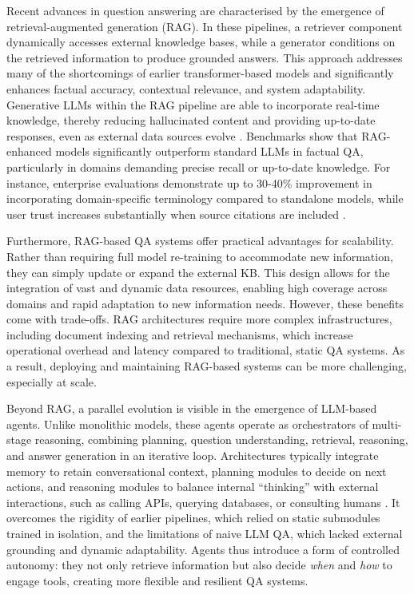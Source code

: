 \begin{spacing}{1.5}
Recent advances in question answering are characterised by the emergence of retrieval-augmented generation (RAG). In these pipelines, a retriever component dynamically accesses external knowledge bases, while a generator conditions on the retrieved information to produce grounded answers. This approach addresses many of the shortcomings of earlier transformer-based models and significantly enhances factual accuracy, contextual relevance, and system adaptability. Generative LLMs within the RAG pipeline are able to incorporate real-time knowledge, thereby reducing hallucinated content and providing up-to-date responses, even as external data sources evolve \citep{yue_survey_2025,lewis_retrieval-augmented_2020}. Benchmarks show that RAG-enhanced models significantly outperform standard LLMs in factual QA, particularly in domains demanding precise recall or up-to-date knowledge. For instance, enterprise evaluations demonstrate up to 30-40\% improvement in incorporating domain-specific terminology compared to standalone models, while user trust increases substantially when source citations are included \citep{vaibhav_retrieval-augmented_2025}.

Furthermore, RAG-based QA systems offer practical advantages for scalability. Rather than requiring full model re-training to accommodate new information, they can simply update or expand the external KB. This design allows for the integration of vast and dynamic data resources, enabling high coverage across domains and rapid adaptation to new information needs. However, these benefits come with trade-offs. RAG architectures require more complex infrastructures, including document indexing and retrieval mechanisms, which increase operational overhead and latency compared to traditional, static QA systems. As a result, deploying and maintaining RAG-based systems can be more challenging, especially at scale.

Beyond RAG, a parallel evolution is visible in the emergence of LLM-based agents. Unlike monolithic models, these agents operate as orchestrators of multi-stage reasoning, combining planning, question understanding, retrieval, reasoning, and answer generation in an iterative loop. Architectures typically integrate memory to retain conversational context, planning modules to decide on next actions, and reasoning modules to balance internal ``thinking'' with external interactions, such as calling APIs, querying databases, or consulting humans \parencite{yue_survey_2025}. It overcomes the rigidity of earlier pipelines, which relied on static submodules trained in isolation, and the limitations of naive LLM QA, which lacked external grounding and dynamic adaptability. Agents thus introduce a form of controlled autonomy: they not only retrieve information but also decide \textit{when} and \textit{how} to engage tools, creating more flexible and resilient QA systems.


\end{spacing}
